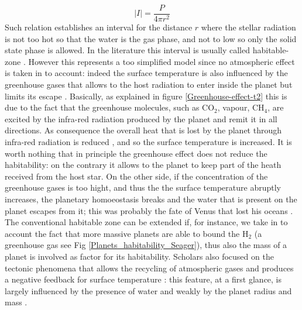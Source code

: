 \documentclass[
12pt, %
a4paper, %
oneside, %
headinclude,footinclude, %
BCOR5mm, %
]{scrartcl}
\begin{document}
\begin{equation}
\lvert I \rvert=\dfrac{P}{4\pi r^{2}}
\end{equation}
Such relation establishes an interval for the distance $r$ where the stellar radiation is not too hot so that the water is the gas phase, and not to low so only the solid state phase is allowed. In the literature this interval is usually called habitable-zone \cite{kasting1993habitable}. However this represents a too simplified model since no atmospheric effect is taken in to account: indeed the surface temperature is also influenced by the greenhouse gases that allows to the host radiation to enter inside the planet but limits its escape \cite{seager2013exoplanet,forget2014possible}. Basically, as explained in figure \ref{Greenhouse-effect-t2} this is due to the fact that the greenhouse molecules, such as CO$_{2}$, vapour, CH$_{4}$, are excited by the infra-red radiation produced by the planet and remit it in all directions. As consequence the overall heat that is lost by the planet through infra-red radiation is reduced \cite{pierrehumbert2011infrared}, and so the surface temperature is increased. It is worth nothing that in principle the greenhouse effect does not reduce the habitability: on the contrary it allows to the planet to keep part of the heath received from the host star. On the other side, if the concentration of the greenhouse gases is too hight, and thus the the surface temperature abruptly increases, the planetary homoeostasis\cite{lovelock1974atmospheric,lovelock1982life,caldeira1992life} breaks and the water that is present on the planet escapes from it; this was probably the fate of Venus that lost his oceans \cite{way2016venus,luger2015extreme,seager2013exoplanet}. The conventional habitable zone can be extended if, for instance, we take in to account the fact that more massive planets are able to bound the H$_{2}$ (a greenhouse gas see Fig \ref{Planets_habitability_Seager}), thus also the mass of a planet is involved as factor for its habitability. Scholars \cite{tackley2012habitable} also focused on the tectonic phenomena that allows the recycling of atmospheric gases and produces a negative feedback for surface temperature \cite{walker1981negative}: this feature, at a first glance, is largely influenced by the presence of water \cite{korenaga2010likelihood,o2007geological} and weakly by the planet radius \cite{o2007geological} and mass \cite{korenaga2010likelihood}.
  
\end{document}
